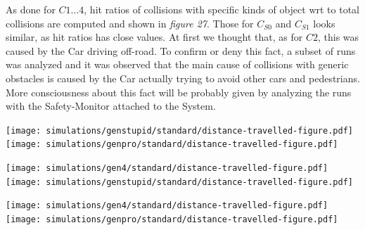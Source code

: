 As done for $C1\dots 4$, hit ratios of collisions with specific kinds of object wrt to total collisions are computed and shown in \textsl{figure 27}. Those for $C_{S0}$ and $C_{S1}$ looks similar, as hit ratios has close values. At first we thought that, as for $C2$, this was caused by the Car driving off-road. To confirm or deny this fact, a subset of runs was analyzed and it was observed that the main cause of collisions with generic obstacles is caused by the Car actually trying to avoid other cars and pedestrians. More consciousness about this fact will be probably given by analyzing the runs with the Safety-Monitor attached to the System.

\begin{minipage}[c]{\textwidth}
	\texttt{[image: simulations/genstupid/standard/distance-travelled-figure.pdf]}
	\vspace{0.5cm}
	\texttt{[image: simulations/genpro/standard/distance-travelled-figure.pdf]}
\end{minipage}

\begin{minipage}[c]{\textwidth}
	\texttt{[image: simulations/gen4/standard/distance-travelled-figure.pdf]}
	\vspace{0.5cm}
	\texttt{[image: simulations/genstupid/standard/distance-travelled-figure.pdf]}
\end{minipage}

\begin{minipage}[c]{\textwidth}
	\texttt{[image: simulations/gen4/standard/distance-travelled-figure.pdf]}
	\vspace{0.5cm}
	\texttt{[image: simulations/genpro/standard/distance-travelled-figure.pdf]}
\end{minipage}

